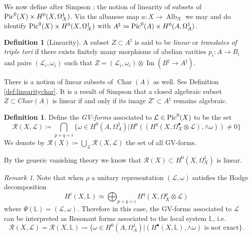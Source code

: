 \documentclass[11pt,reqno]{amsart}
\theoremstyle{definition}
\newtheorem{definition}[theorem]{Definition}
\theoremstyle{remark}
\newtheorem{remark}[theorem]{Remark}
\theoremstyle{cited}
\theoremstyle{citeddef}
\DeclareMathOperator{\Alb}{Alb}
\DeclareMathOperator{\Char}{Char}
\DeclareMathOperator{\im}{Im}
\def\Pic{{\rm Pic}}
\newcommand{\sL}{\mathcal{L}}
\newcommand{\sR}{\mathcal{R}}
\newcommand{\bbL}{\mathbb{L}}
\begin{document}
We now define after Simpson \cite[p.\ 365]{Sim93}; the notion of linearity of subsets of 
$\Pic^0(X)\times H^0(X,\Omega_X^1)$. Via the albanese
map $a\colon X\to \Alb_X$ we may and do identify
$\Pic^0(X)\times H^0(X,\Omega_X^1)$ with
$A^{\natural} \coloneqq \Pic^0(A)\times H^0(A,\Omega_A^1)$.
\begin{definition}[Linearity]\label{def:linhiggs}
A subset $Z\subset A^{\natural}$ is said to be \textsl{linear}
or \textsl{translates of triple tori}
if there exists finitely many morphisms of abelian varities
$p_i\colon A\to B_i$ and pairs $(\sL_i,\omega_i)$
such that $Z= (\sL_i,\omega_i)\otimes \im(B^{\natural}
\to A^{\natural})$.
\end{definition}
There is a notion of linear subsets of $\Char(A)$ as well. 
See Definition \ref{def:linearitychar}. It is a result of Simpson \cite[Theorem 3.1]{Sim93} that a closed algebraic subset $Z \subset Char(A)$ is linear if and only if its image $Z'\subset A^{\natural}$ remains algebraic. 

\begin{definition}
Define the \textsl{GV-forms} associated to $\sL\in \Pic^0(X)$
 to be the set
\[\sR(X, \sL) \coloneqq \bigcap_{p+q = i}\{\omega\in H^0(A,\Omega_A^1)|H^p((H^q(X,\Omega_X^{\bullet}\otimes \sL),\wedge\omega)) \neq 0
\}
\]
We denote by $\sR(X) \coloneqq \bigcup_{\sL}\sR(X, \sL)$
the set of all GV-forms.
\end{definition}

By the generic vanishing theory \cite[Theorem 3]{Ara}
we know that $\sR(X)\subset H^0(X,\Omega_X^1)$ is linear.
\begin{remark}
Note that when $\rho$ a unitary representation 
$(\sL, \omega)$ satisfies the Hodge decomposition
\[H^i(X, \bbL) \simeq \bigoplus_{p+q=i}H^{q}(X, \Omega_X^p\otimes \sL)\]
where $\Psi(\bbL ) = (\sL,\omega)$.
Therefore in this case, the GV-forms associated to 
$\sL$ can be interpreted
as Resonant forms associated to the local system $\bbL$,
i.e.\ 
\[\sR(X, \sL) = \sR(X, \bbL) \coloneqq \{\omega\in H^0(A,\Omega_A^1)| (H^{\bullet}(X,\bbL),\wedge\omega) \text{ is not exact}\}.\]
\end{remark} 
\end{document}
